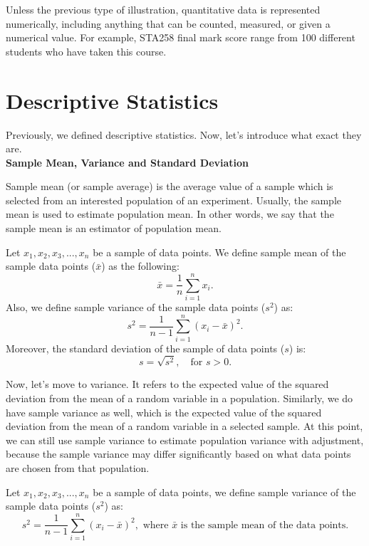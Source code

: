 \begin{definition}
Unless the previous type of illustration, quantitative data is represented numerically, including anything that can be counted, measured, or given a numerical value. For example, STA258 final mark score range from 100 different students who have taken this course.
\end{definition}

\section{Descriptive Statistics}

\noindent
Previously, we defined descriptive statistics. Now, let's introduce what exact they are.\\

\noindent
\textbf{Sample Mean, Variance and Standard Deviation}

\noindent
Sample mean (or sample average) is the average value of a sample which is selected from an interested population of an experiment. Usually, the sample mean is used to estimate population mean. In other words, we say that the sample mean is an estimator of population mean.

\begin{definition}
 Let $x_1, x_2, x_3, ..., x_n$ be a sample of data points. We define sample mean of the sample data points ($\bar{x}$) as the following: \[ \bar{x} = \frac{1}{n} \sum_{i=1}^{n} x_i.\] Also, we define sample variance of the sample data points ($s^2$) as: \[ s^2 = \frac{1}{n-1} \sum_{i=1}^{n}(x_i - \bar{x})^2.\] Moreover, the standard deviation of the sample of data points ($s$) is: \[ s = \sqrt{s^2}, \quad \text{for } s > 0.\]
\end{definition}

\noindent
Now, let's move to variance. It refers to the expected value of the squared deviation from the mean of a random variable in a population. Similarly, we do have sample variance as well, which is the expected value of the squared deviation from the mean of a random variable in a selected sample. At this point, we can still use sample variance to estimate population variance with adjustment, because the sample variance may differ significantly based on what data points are chosen from that population.

\begin{definition}
Let $x_1, x_2, x_3, ..., x_n$ be a sample of data points, we define sample variance of the sample data points ($s^2$) as: \[ s^2 = \frac{1}{n-1} \sum_{i=1}^{n}(x_i - \bar{x})^2, \text{ where $\bar{x}$ is the sample mean of the data points.}\]
\end{definition}

